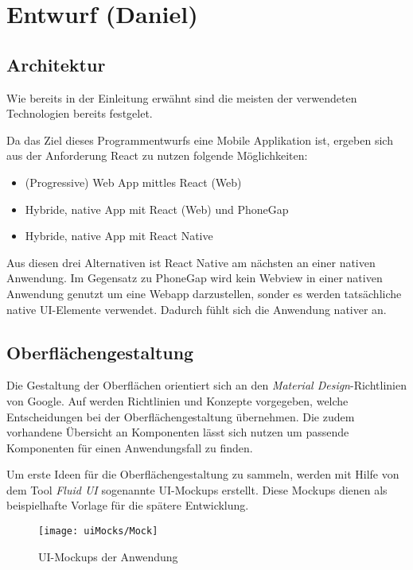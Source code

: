 \section{Entwurf (Daniel)}\label{sec:entwurf}


\subsection{Architektur}
Wie bereits in der Einleitung erwähnt sind die meisten der verwendeten Technologien bereits festgelet.

Da das Ziel dieses Programmentwurfs eine Mobile Applikation ist, ergeben sich aus der Anforderung React zu nutzen folgende Möglichkeiten:
\begin{itemize}
    \item (Progressive) Web App mittles React (Web)
    \item Hybride, native App mit React (Web) und PhoneGap
    \item Hybride, native App mit React Native
\end{itemize}

Aus diesen drei Alternativen ist React Native am nächsten an einer nativen Anwendung.
Im Gegensatz zu PhoneGap wird kein Webview in einer nativen Anwendung genutzt um eine Webapp darzustellen,
sonder es werden tatsächliche native UI-Elemente verwendet.
Dadurch fühlt sich die Anwendung nativer an.


\subsection{Oberflächengestaltung}
Die Gestaltung der Oberflächen orientiert sich an den \textit{Material Design}-Richtlinien von Google.
Auf \cite{DesignMa49:online} werden Richtlinien und Konzepte vorgegeben,
welche Entscheidungen bei der Oberflächengestaltung übernehmen.
Die zudem vorhandene Übersicht an Komponenten lässt sich nutzen um passende Komponenten für einen Anwendungsfall zu finden.

Um erste Ideen für die Oberflächengestaltung zu sammeln,
werden mit Hilfe von dem Tool \textit{Fluid UI} \cite{FluidUIc8:online} sogenannte UI-Mockups erstellt.
Diese Mockups dienen als beispielhafte Vorlage für die spätere Entwicklung.


\begin{figure}[h]
    \centering
    \texttt{[image: uiMocks/Mock]}
    \caption{UI-Mockups der Anwendung}
\end{figure}



